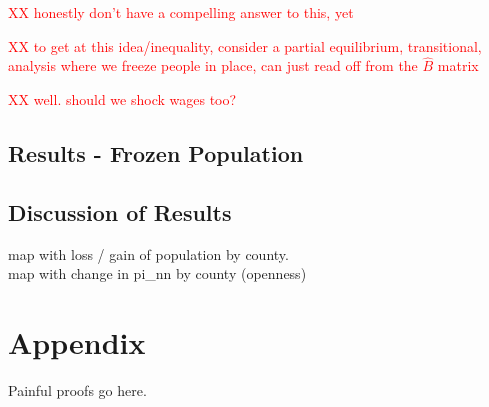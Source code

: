 \documentclass{article}
\begin{document}
\textcolor{red}{XX honestly don't have a compelling answer to this, yet}


\textcolor{red}{XX to get at this idea/inequality, consider a partial equilibrium, transitional, analysis where we freeze people in place, can just read off from the $\hat B$ matrix }

\textcolor{red}{XX well. should we shock wages too? }

\subsection{Results - Frozen Population}
\subsection{Discussion of Results}

map with loss / gain of population by county. \\
map with change in pi_{nn} by county (openness)


\section{Appendix}
Painful proofs go here.


\end{document}
